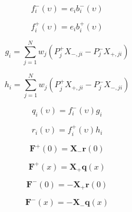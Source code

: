 \begin{equation}
f^{-}_{i}(\upsilon) = e_{i} b^{-}_{i}(\upsilon)
\label{eq:solar_source-local_solar_source-greens_function_forward-f_m}
\end{equation}

\begin{equation}
f^{+}_{i}(\upsilon) = e_{i} b^{+}_{i}(\upsilon)
\label{eq:solar_source-local_solar_source-greens_function_forward-f_p}
\end{equation}

\begin{equation}
g_{i} = \sum^{N}_{j = 1} w_{j} (P^{+}_{j}X_{-,ji} - P^{-}_{j}X_{+,ji})
\label{eq:solar_source-local_solar_source-greens_function_forward-g}
\end{equation}

\begin{equation}
h_{i} = \sum^{N}_{j = 1} w_{j} (P^{+}_{j}X_{+,ji} - P^{-}_{j}X_{-,ji})
\label{eq:solar_source-local_solar_source-greens_function_forward-h}
\end{equation}

\begin{equation}
q_{i}(\upsilon) = f^{-}_{i}(\upsilon) g_{i}
\label{eq:solar_source-local_solar_source-greens_function_forward-q}
\end{equation}

\begin{equation}
r_{i}(\upsilon) = f^{+}_{i}(\upsilon) h_{i}
\label{eq:solar_source-local_solar_source-greens_function_forward-r}
\end{equation}

\begin{equation}
\mathbf{F}^{+}(0) = \mathbf{X}_{-}\mathbf{r}(0)
\label{eq:solar_source-local_solar_source-greens_function_forward-F_p_0}
\end{equation}

\begin{equation}
\mathbf{F}^{+}(x) = \mathbf{X}_{+}\mathbf{q}(x)
\label{eq:solar_source-local_solar_source-greens_function_forward-F_p_x}
\end{equation}

\begin{equation}
\mathbf{F}^{-}(0) = -\mathbf{X}_{+}\mathbf{r}(0)
\label{eq:solar_source-local_solar_source-greens_function_forward-F_m_0}
\end{equation}

\begin{equation}
\mathbf{F}^{-}(x) = -\mathbf{X}_{-}\mathbf{q}(x)
\label{eq:solar_source-local_solar_source-greens_function_forward-F_m_x}
\end{equation}


